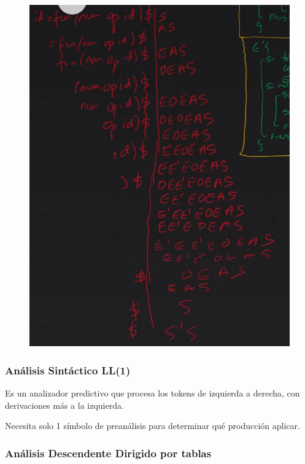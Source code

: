 \documentclass[12pt, twoside, openright]{report} %
\begin{document}
\begin{figure}[H]
	{\includegraphics[scale=.7]{2021-03-26 17_50_51-Ejercicio descendente recursivo.png}}
\end{figure}

\pagebreak

\subsubsection{Análisis Sintáctico LL(1)}

Es un analizador predictivo que procesa los tokens de izquierda a
derecha, con derivaciones más a la izquierda.

Necesita solo 1 símbolo de preanálisis para determinar qué producción
aplicar.


\subsubsection{Análisis Descendente Dirigido por tablas}
\end{document}
